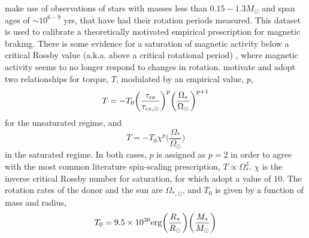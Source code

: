 \citet{matt2015} make use of observations of stars with masses less than $0.15 - 1.3 M_\odot$ and span ages of $\sim 10^{6-9}$ yrs, that have had their rotation periods measured. This dataset is used to calibrate a theoretically motivated empirical prescription for magnetic braking. There is some evidence for a saturation of magnetic activity below a critical Rossby value (a.k.a. above a critical rotational period) \citep{reiners2009}, where magnetic activity seems to no longer respond to changes in rotation. \citet{matt2015} motivate and adopt two relationships for torque, $T$, modulated by an empirical value, $p$,
\begin{equation}
    T = -T_0 \bigg( \frac{\tau_{\rm cz}}{\tau_{cz,\odot}} \bigg)^p \bigg( \frac{\Omega_{*}}{\Omega_{\odot}} \bigg)^{p+1} 
\end{equation}
for the unsaturated regime, and 
\begin{equation}
    T = -T_0 \chi^p \bigg( \frac{\Omega_*}{\Omega_\odot} \bigg)
\end{equation}
in the saturated regime. In both cases, $p$ is assigned as $p = 2$ in order to agree with the most common literature spin-scaling prescription, $T \propto \Omega_*^3$. 
$\chi$ is the inverse critical Rossby number for saturation, for which \citet{matt2015} adopt a value of $10$.
The rotation rates of the donor and the sun are $\Omega_{*,\odot}$, and $T_0$ is given by a function of mass and radius,
\begin{equation}
    T_0 = 9.5 \times 10^{30} {\rm erg} \bigg(\frac{R_*}{R_\odot} \bigg) \bigg(\frac{M_*}{M_\odot} \bigg)
\end{equation}

